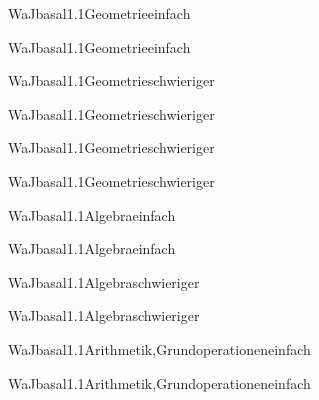 \documentclass[12pt]{article}
\begin{document}
\begin{Add}{WaJ}{basal1.1}{Geometrie}{einfach}
\solution{ }
\end{Add}
\begin{Add}{WaJ}{basal1.1}{Geometrie}{einfach}
\end{Add}

\begin{Add}{WaJ}{basal1.1}{Geometrie}{schwieriger}
\solution{ }
\end{Add}
\begin{Add}{WaJ}{basal1.1}{Geometrie}{schwieriger}
\end{Add}

\begin{Add}{WaJ}{basal1.1}{Geometrie}{schwieriger}
\solution{ }
\end{Add}
\begin{Add}{WaJ}{basal1.1}{Geometrie}{schwieriger}
\end{Add}

\begin{Add}{WaJ}{basal1.1}{Algebra}{einfach}
\solution{ }
\end{Add}
\begin{Add}{WaJ}{basal1.1}{Algebra}{einfach}
\end{Add}

\begin{Add}{WaJ}{basal1.1}{Algebra}{schwieriger}
\solution{ }
\end{Add}
\begin{Add}{WaJ}{basal1.1}{Algebra}{schwieriger}
\end{Add}

\begin{Add}{WaJ}{basal1.1}{Arithmetik,Grundoperationen}{einfach}
\solution{ }
\end{Add}
\begin{Add}{WaJ}{basal1.1}{Arithmetik,Grundoperationen}{einfach}
\end{Add}
\end{document}
